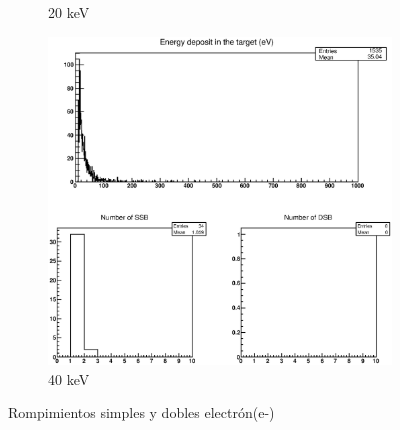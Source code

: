 \begin{figure}
\begin{subfigure}{.5\textwidth}
  \caption{20 keV}
  \label{fig:sube7}
\end{subfigure}%
\begin{subfigure}{.5\textwidth}
  \centering
  \includegraphics[width=.78\linewidth]{./Figures/e40kev.eps}
  \caption{40 keV}
  \label{fig:sube8}
\end{subfigure}
\caption[Rompimientos simples y dobles electrón(e-)]{Rompimientos simples y dobles electrón(e-)}
\label{fig:e}
\end{figure}

